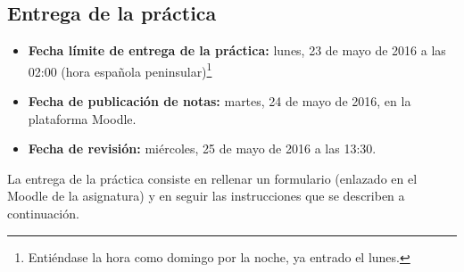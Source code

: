 \subsection{Entrega de la práctica}

\begin{itemize}
  \item \textbf{Fecha límite de entrega de la práctica:} lunes, 23 de mayo de 2016 a las 02:00 (hora española peninsular)\footnote{Entiéndase la hora como domingo por la noche, ya entrado el lunes.}

  \item \textbf{Fecha de publicación de notas:} martes, 24 de mayo de 2016, en la plataforma Moodle.

  \item \textbf{Fecha de revisión:} miércoles, 25 de mayo de 2016 a las 13:30.
\end{itemize}

La entrega de la práctica consiste en rellenar un formulario (enlazado en el Moodle de la asignatura) y en seguir las instrucciones que se describen a continuación.

